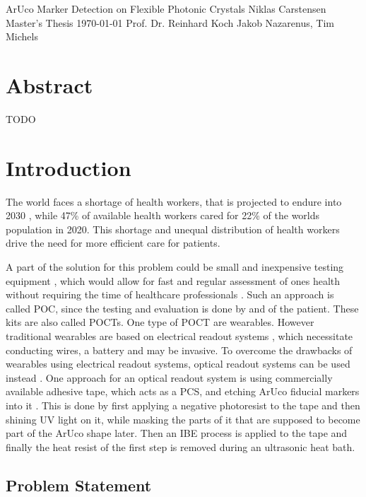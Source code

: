 \documentclass[10pt]{book}
\newcommand*\NewPage{\newpage\null\thispagestyle{empty}\newpage}
\begin{document}
\frontmatter

\studtitlepage%
{ArUco Marker Detection on Flexible Photonic Crystals}%
{}
{Niklas Carstensen}%
{Master's Thesis}%
{\today}%
{Prof. Dr. Reinhard Koch}%
{Jakob Nazarenus, Tim Michels}%
\NewPage{}
\setcounter{page}{2}
\studeidesstatt
\NewPage{}

\setcounter{page}{3}
\chapter*{Abstract}
TODO

\tableofcontents
\listoffigures
\mainmatter
\chapter{Introduction}

The world faces a shortage of health workers, that is projected to endure into 2030 \cite{BMJHealthWorkforce22}, while 47\% of available health workers cared for 22\% of the worlds population in 2020. This shortage and unequal distribution of health workers drive the need for more efficient care for patients. 

A part of the solution for this problem could be small and inexpensive testing equipment \cite{Fab23}, which would allow for fast and regular assessment of ones health without requiring the time of healthcare professionals \cite{POC12}. Such an approach is called \ac{POC}, since the testing and evaluation is done by and of the patient. These kits are also called \acp{POCT}. One type of \ac{POCT} are wearables. However traditional wearables are based on electrical readout systems \cite{gao2019flexible}, which necessitate conducting wires, a battery and may be invasive. To overcome the drawbacks of wearables using electrical readout systems, optical readout systems can be used instead \cite{nguyen2021wearable}. One approach for an optical readout system is using commercially available adhesive tape, which acts as a \ac{PCS}, and etching \ac{ArUco} fiducial markers into it \cite{Fab23}. This is done by first applying a negative photoresist to the tape and then shining UV light on it, while masking the parts of it that are supposed to become part of the \ac{ArUco} shape later. Then an \ac{IBE} process is applied to the tape and finally the heat resist of the first step is removed during an ultrasonic heat bath.

\section{Problem Statement}
\end{document}
